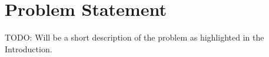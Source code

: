 \section{Problem Statement} %
\label{sec:problem_statement}

TODO: Will be a short description of the problem as highlighted in the Introduction.

